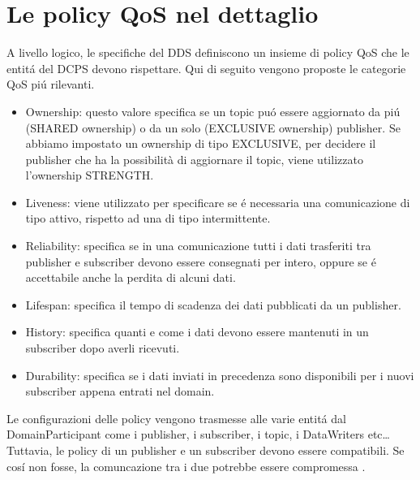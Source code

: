 \section{Le policy QoS nel dettaglio}
A livello logico, le specifiche del DDS
definiscono un insieme di policy QoS
che le entitá del DCPS devono rispettare. Qui di seguito vengono
proposte le categorie QoS piú rilevanti.
\begin{itemize}
    \item Ownership: questo valore specifica se un topic
    puó essere aggiornato da piú 
    (SHARED ownership) o da un solo (EXCLUSIVE ownership) publisher.
    Se abbiamo impostato un ownership di tipo EXCLUSIVE, per decidere il 
    publisher che ha la possibilità di aggiornare il topic, viene 
    utilizzato l'ownership STRENGTH.
    \item Liveness: viene utilizzato per specificare se é necessaria
    una comunicazione di tipo attivo, rispetto ad una di tipo 
    intermittente.
    \item Reliability: specifica se in una comunicazione tutti i dati
    trasferiti tra publisher e subscriber devono essere consegnati
    per intero, oppure
    se é accettabile anche la perdita di alcuni dati.
    \item Lifespan: specifica il tempo di scadenza dei dati pubblicati da 
    un publisher.
    \item History: specifica quanti e come i dati devono essere 
    mantenuti in un 
    subscriber dopo averli ricevuti.
    \item Durability: specifica se i dati inviati in precedenza sono
    disponibili per i nuovi subscriber appena entrati nel domain.
\end{itemize}
Le configurazioni 
delle policy vengono trasmesse alle varie entitá dal DomainParticipant
come i publisher, i subscriber, i topic, i DataWriters etc\dots
Tuttavia, le policy di un publisher e un subscriber devono essere compatibili.
Se cosí non fosse, la comuncazione tra i due potrebbe essere compromessa
\cite{Michaud2017Apr}.
\label{Le policy QoS nel dettaglio}


